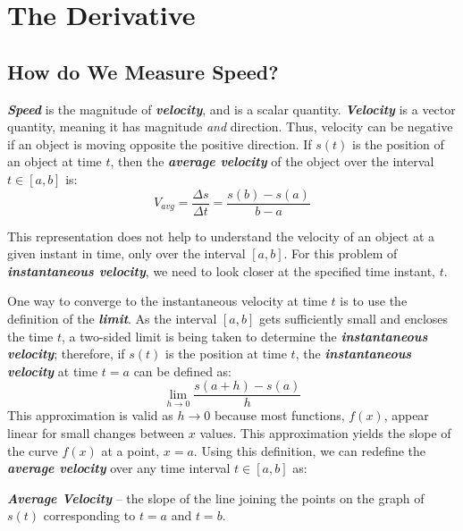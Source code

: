 \chapter{The Derivative}
\section{How do We Measure Speed?}
\textbf{\textit{Speed}} is the magnitude of \textbf{\textit{velocity}}, and is a scalar quantity. \textbf{\textit{Velocity}} is a vector quantity, meaning it has magnitude \textit{and} direction. Thus, velocity can be negative if an object is moving opposite the positive direction. If $s(t)$ is the position of an object at time $t$, then the \textbf{\textit{average velocity}} of the object over the interval $t \in \left[a, b\right]$ is:
\begin{equation}
\label{eq:DQ}
V_{avg} = \frac{\Delta s}{\Delta t} = \frac{s(b) - s(a)}{b - a}
\end{equation}

This representation does not help to understand the velocity of an object at a given instant in time, only over the interval $[a, b]$. For this problem of \textbf{\textit{instantaneous velocity}}, we need to look closer at the specified time instant, $t$.

\vspace{0.1in}
One way to converge to the instantaneous velocity at time $t$ is to use the definition of the \textbf{\textit{limit}}. As the interval $[a,b]$ gets sufficiently small and encloses the time $t$, a two-sided limit is being taken to determine the \textbf{\textit{instantaneous velocity}}; therefore, if $s(t)$ is the position at time $t$, the \textbf{\textit{instantaneous velocity}} at time $t = a$ can be defined as:
\begin{equation}
\lim_{h\rightarrow 0} \frac{s(a+h) - s(a)}{h}
\end{equation}
This approximation is valid as $h\rightarrow 0$ because most functions, $f(x)$, appear linear for small changes between $x$ values. This approximation yields the slope of the curve $f(x)$ at a point, $x = a$. Using this definition, we can redefine the \textbf{\textit{average velocity}} over any time interval $t \in [a, b]$ as:

\vspace{0.1in}
\textbf{\textit{Average Velocity}} -- the slope of the line joining the points on the graph of $s(t)$ corresponding to $t = a$ and $t = b$.

